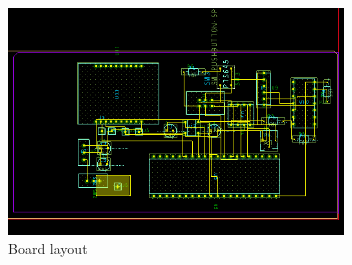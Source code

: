 \begin{figure}[h]
\begin{center}
\includegraphics[width=3.5in]{../figures/layout.png}
\end{center}
\caption{Board layout}
\label{fig:sys_test_up}
\end{figure}